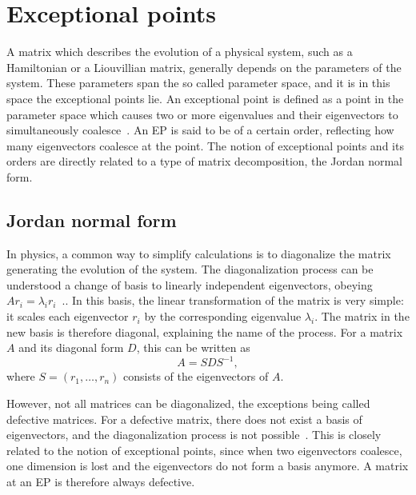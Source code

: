 \documentclass[../main.tex]{subfiles}
\begin{document}
\section{Exceptional points}\label{sec:ep}
A matrix which describes the evolution of a physical system, such as a Hamiltonian or a Liouvillian matrix, generally depends on the parameters of the system. These parameters span the so called parameter space, and it is in this space the exceptional points lie. An exceptional point is defined as a point in the parameter space which causes two or more eigenvalues and their eigenvectors to simultaneously coalesce~\cite{nonHermrev}. An EP is said to be of a certain order, reflecting how many eigenvectors coalesce at the point. The notion of exceptional points and its orders are directly related to a type of matrix decomposition, the Jordan normal form.

\subsection{Jordan normal form}\label{sec:jordan}

In physics, a common way to simplify calculations is to diagonalize the matrix generating the evolution of the system. The diagonalization process can be understood a change of basis to linearly independent eigenvectors, obeying $Ar_i=\lambda_ir_i$~\cite{uffe}.. In this basis, the linear transformation of the matrix is very simple: it scales each eigenvector $r_i$ by the corresponding eigenvalue $\lambda_i$. The matrix in the new basis is therefore diagonal, explaining the name of the process. For a matrix $A$ and its diagonal form $D$, this can be written as 
\begin{equation}
    A = SDS^{-1},
\end{equation}
where $S = (r_1, \dots ,r_n)$ consists of the eigenvectors of $A$.

However, not all matrices can be diagonalized, the exceptions being called defective matrices. For a defective matrix, there does not exist a basis of eigenvectors, and the diagonalization process is not possible~\cite{uffe}. This is closely related to the notion of exceptional points, since when two eigenvectors coalesce, one dimension is lost and the eigenvectors do not form a basis anymore. A matrix at an EP is therefore always defective.
\end{document}
